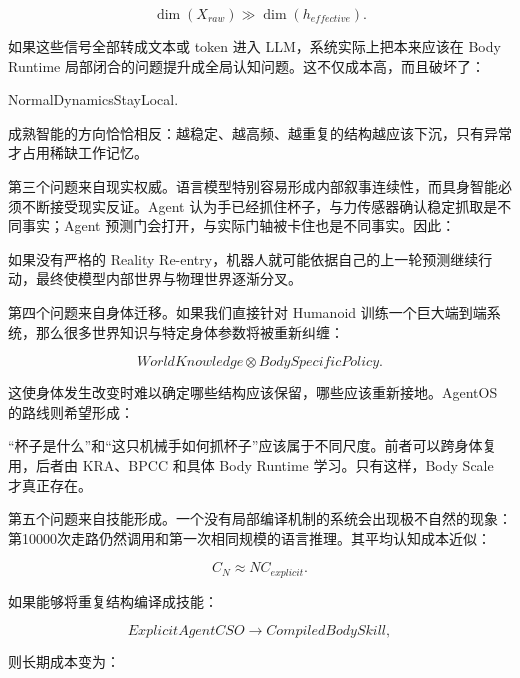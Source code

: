 $$
\dim(X_{raw})\gg\dim(h_{effective}).
$$

如果这些信号全部转成文本或 token 进入 LLM，系统实际上把本来应该在 Body Runtime 局部闭合的问题提升成全局认知问题。这不仅成本高，而且破坏了：

\begin{statementbox}
NormalDynamicsStayLocal.
\end{statementbox}

成熟智能的方向恰恰相反：越稳定、越高频、越重复的结构越应该下沉，只有异常才占用稀缺工作记忆。

第三个问题来自现实权威。语言模型特别容易形成内部叙事连续性，而具身智能必须不断接受现实反证。Agent 认为手已经抓住杯子，与力传感器确认稳定抓取是不同事实；Agent 预测门会打开，与实际门轴被卡住也是不同事实。因此：

\begin{statementbox}
\centering
{}
\end{statementbox}

如果没有严格的 Reality Re-entry，机器人就可能依据自己的上一轮预测继续行动，最终使模型内部世界与物理世界逐渐分叉。

第四个问题来自身体迁移。如果我们直接针对 Humanoid 训练一个巨大端到端系统，那么很多世界知识与特定身体参数将被重新纠缠：

$$
WorldKnowledge
\otimes
BodySpecificPolicy.
$$

这使身体发生改变时难以确定哪些结构应该保留，哪些应该重新接地。AgentOS 的路线则希望形成：

\begin{statementbox}
\centering
{}
\end{statementbox}

“杯子是什么”和“这只机械手如何抓杯子”应该属于不同尺度。前者可以跨身体复用，后者由 KRA、BPCC 和具体 Body Runtime 学习。只有这样，Body Scale 才真正存在。

第五个问题来自技能形成。一个没有局部编译机制的系统会出现极不自然的现象：第10000次走路仍然调用和第一次相同规模的语言推理。其平均认知成本近似：

$$
C_N
\approx
N C_{explicit}.
$$

如果能够将重复结构编译成技能：

$$
ExplicitAgentCSO
\rightarrow
CompiledBodySkill,
$$

则长期成本变为：

